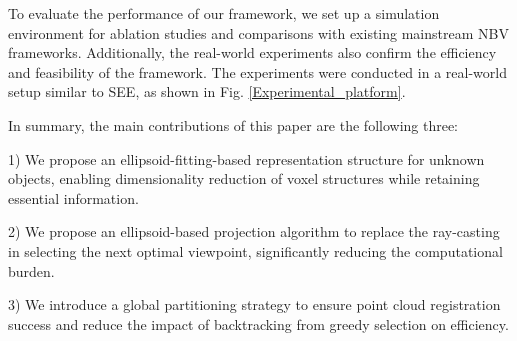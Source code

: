 To evaluate the performance of our framework, we set up a simulation environment for ablation studies and comparisons with existing mainstream NBV frameworks. Additionally, the real-world experiments also confirm the efficiency and feasibility of the framework. The experiments were conducted in a real-world setup similar to SEE\cite{border2024surface}, as shown in Fig. \ref{Experimental_platform}.


In summary, the main contributions of this paper are the following three:

1) We propose an ellipsoid-fitting-based representation structure for unknown objects, enabling dimensionality reduction of voxel structures while retaining essential information.

2) We propose an ellipsoid-based projection algorithm to replace the ray-casting in selecting the next optimal viewpoint, significantly reducing the computational burden.
  
3) We introduce a global partitioning strategy to ensure point cloud registration success and reduce the impact of backtracking from greedy selection on efficiency.

